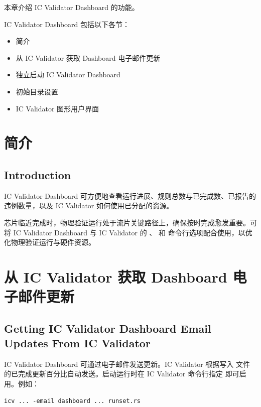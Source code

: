 \label{chap:dashboard}

本章介绍 IC Validator Dashboard 的功能。

IC Validator Dashboard 包括以下各节：
\begin{itemize}
  \item 简介
  \item 从 IC Validator 获取 Dashboard 电子邮件更新
  \item 独立启动 IC Validator Dashboard
  \item 初始目录设置
  \item IC Validator 图形用户界面
\end{itemize}

\section{简介}
\subsection*{Introduction}

IC Validator Dashboard 可方便地查看运行进展、规则总数与已完成数、已报告的违例数量，以及 IC Validator 如何使用已分配的资源。

芯片临近完成时，物理验证运行处于流片关键路径上，确保按时完成愈发重要。可将 IC Validator Dashboard 与 IC Validator 的 、 和  命令行选项配合使用，以优化物理验证运行与硬件资源。

\section{从 IC Validator 获取 Dashboard 电子邮件更新}
\subsection*{Getting IC Validator Dashboard Email Updates From IC Validator}

IC Validator Dashboard 可通过电子邮件发送更新。IC Validator 根据写入  文件的已完成更新百分比自动发送。启动运行时在 IC Validator 命令行指定  即可启用。例如：

\begin{lstlisting}
icv ... -email dashboard ... runset.rs
\end{lstlisting}

